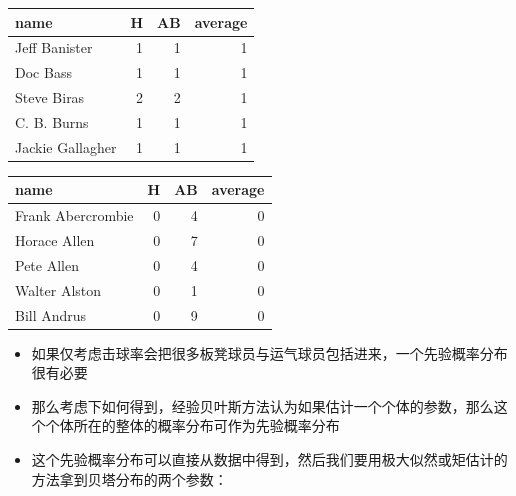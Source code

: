 \documentclass[
]{book}
\newenvironment{Shaded}{\begin{snugshade}}{\end{snugshade}}
\newcommand{\CommentTok}[1]{\textcolor[rgb]{0.56,0.35,0.01}{\textit{#1}}}
\newcommand{\DecValTok}[1]{\textcolor[rgb]{0.00,0.00,0.81}{#1}}
\newcommand{\KeywordTok}[1]{\textcolor[rgb]{0.13,0.29,0.53}{\textbf{#1}}}
\newcommand{\NormalTok}[1]{#1}
\newcommand{\OperatorTok}[1]{\textcolor[rgb]{0.81,0.36,0.00}{\textbf{#1}}}
\newcommand{\StringTok}[1]{\textcolor[rgb]{0.31,0.60,0.02}{#1}}
\begin{document}
\begin{Shaded}
\end{Shaded}

\begin{tabular}{l|r|r|r}
\hline
name & H & AB & average\\
\hline
Jeff Banister & 1 & 1 & 1\\
\hline
Doc Bass & 1 & 1 & 1\\
\hline
Steve Biras & 2 & 2 & 1\\
\hline
C. B. Burns & 1 & 1 & 1\\
\hline
Jackie Gallagher & 1 & 1 & 1\\
\hline
\end{tabular}

\begin{Shaded}
\end{Shaded}

\begin{tabular}{l|r|r|r}
\hline
name & H & AB & average\\
\hline
Frank Abercrombie & 0 & 4 & 0\\
\hline
Horace Allen & 0 & 7 & 0\\
\hline
Pete Allen & 0 & 4 & 0\\
\hline
Walter Alston & 0 & 1 & 0\\
\hline
Bill Andrus & 0 & 9 & 0\\
\hline
\end{tabular}

\begin{itemize}
\item
  如果仅考虑击球率会把很多板凳球员与运气球员包括进来，一个先验概率分布很有必要
\item
  那么考虑下如何得到，经验贝叶斯方法认为如果估计一个个体的参数，那么这个个体所在的整体的概率分布可作为先验概率分布
\item
  这个先验概率分布可以直接从数据中得到，然后我们要用极大似然或矩估计的方法拿到贝塔分布的两个参数：
\end{itemize}
\end{document}
